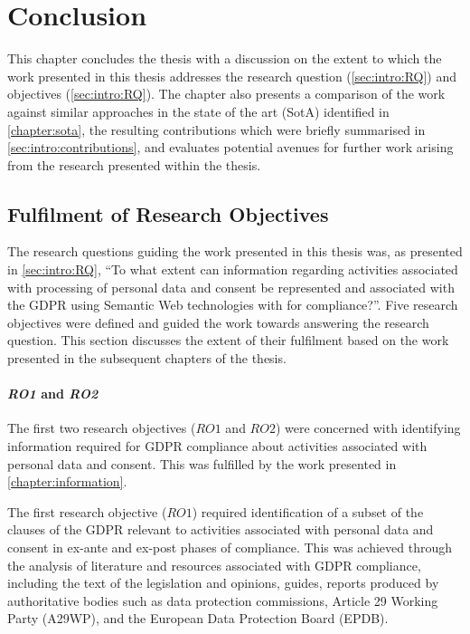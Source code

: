\chapter{Conclusion}
This chapter concludes the thesis with a discussion on the extent to which the work presented in this thesis addresses the research question (\autoref{sec:intro:RQ}) and objectives (\autoref{sec:intro:RQ}). The chapter also presents a comparison of the work against similar approaches in the state of the art (SotA) identified in \autoref{chapter:sota}, the resulting contributions which were briefly summarised in \autoref{sec:intro:contributions}, and evaluates potential avenues for further work arising from the research presented within the thesis.

\section{Fulfilment of Research Objectives}\label{sec:conclusion-RO}
The research questions guiding the work presented in this thesis was, as presented in \autoref{sec:intro:RQ}, ``To what extent can information regarding activities associated with processing of personal data and consent be represented and associated with the GDPR using Semantic Web technologies with for compliance?''.
Five research objectives were defined and guided the work towards answering the research question.
This section discusses the extent of their fulfilment based on the work presented in the subsequent chapters of the thesis.

\subsubsection*{\textit{RO1} and \textit{RO2}}
The first two research objectives ($RO1$ and $RO2$) were concerned with identifying information required for GDPR compliance about activities associated with personal data and consent. This was fulfilled by the work presented in \autoref{chapter:information}.

The first research objective ($RO1$) required identification of a subset of the clauses of the GDPR relevant to activities associated with personal data and consent in ex-ante and ex-post phases of compliance. 
This was achieved through the analysis of literature and resources associated with GDPR compliance, including the text of the legislation and opinions, guides, reports produced by authoritative bodies such as data protection commissions, Article 29 Working Party (A29WP), and the European Data Protection Board (EPDB).

